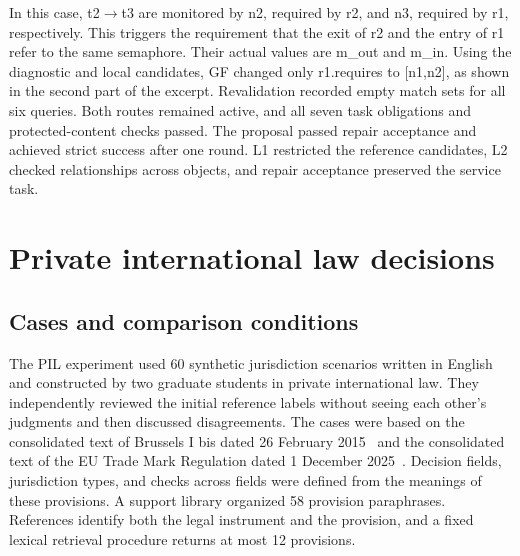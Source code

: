 \documentclass[pdflatex,iicol,sn-mathphys-num]{sn-jnl}
\newcommand{\paperref}[1]{~\citep{#1}}
\begin{document}
In this case, t2\ensuremath{\rightarrow}t3 are monitored by n2, required by r2, and n3, required by r1, respectively. This triggers the requirement that the exit of r2 and the entry of r1 refer to the same semaphore. Their actual values are m\_out and m\_in. Using the diagnostic and local candidates, GF changed only r1.requires to [n1,n2], as shown in the second part of the excerpt. Revalidation recorded empty match sets for all six queries. Both routes remained active, and all seven task obligations and protected-content checks passed. The proposal passed repair acceptance and achieved strict success after one round. L1 restricted the reference candidates, L2 checked relationships across objects, and repair acceptance preserved the service task.


\FloatBarrier

\setcounter{table}{0}

\section{Private international law decisions}\label{app:D}

\subsection{Cases and comparison conditions}\label{app:D-1}

The PIL experiment used 60 synthetic jurisdiction scenarios written in English and constructed by two graduate students in private international law. They independently reviewed the initial reference labels without seeing each other's judgments and then discussed disagreements. The cases were based on the consolidated text of Brussels I bis dated 26 February 2015\paperref{EU1215_2012_Consolidated20150226} and the consolidated text of the EU Trade Mark Regulation dated 1 December 2025\paperref{EU2017_1001_Consolidated20251201}. Decision fields, jurisdiction types, and checks across fields were defined from the meanings of these provisions. A support library organized 58 provision paraphrases. References identify both the legal instrument and the provision, and a fixed lexical retrieval procedure returns at most 12 provisions.
\end{document}
